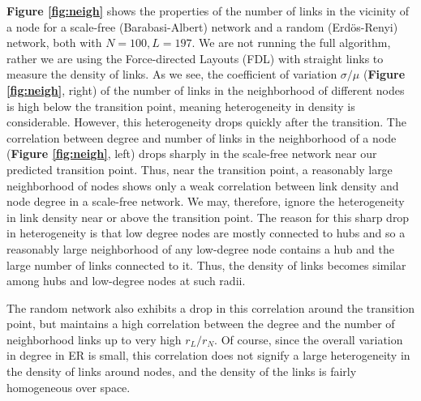 \documentclass[11pt]{article}
\begin{document}
\begin{response}
\textbf{Figure \ref{fig:neigh}} shows the properties of the number of links in the vicinity of a node for a scale-free (Barabasi-Albert) network and a random (Erd\"os-Renyi) network, both with $N=100, L=197$. 
We are not running the full algorithm, rather we are using the Force-directed Layouts (FDL) with straight links to measure the density of links. 
As we see, the coefficient of variation $\sigma/\mu$ (\textbf{Figure \ref{fig:neigh}}, right) of the number of links in the neighborhood of different nodes is high below the transition point, meaning heterogeneity in density is considerable. 
However, this heterogeneity  drops quickly after the transition.  
The correlation between degree and number of links in the neighborhood of a node (\textbf{Figure \ref{fig:neigh}}, left) drops sharply in the scale-free  network near our predicted transition point. 
Thus, near the transition point, a reasonably large neighborhood of nodes shows only a weak correlation between link density and node degree in a scale-free network.
We may, therefore, ignore the heterogeneity in link density near or above the transition point. 
The reason for this sharp drop in heterogeneity is that low degree nodes are mostly connected to hubs and so a reasonably large neighborhood of any low-degree node contains a hub and the large number of links connected to it. Thus, the density of links becomes similar among hubs and low-degree nodes at such radii.  

The random network also exhibits a drop in this correlation around the transition point, but maintains a high correlation between the degree and the number of neighborhood links up to very high $r_L/r_N$. 
Of course, since the overall variation in degree in ER is small, this correlation does not signify a large heterogeneity in the density of links around nodes, and the density of the links is fairly homogeneous over space. 


\end{response}
\end{document}

